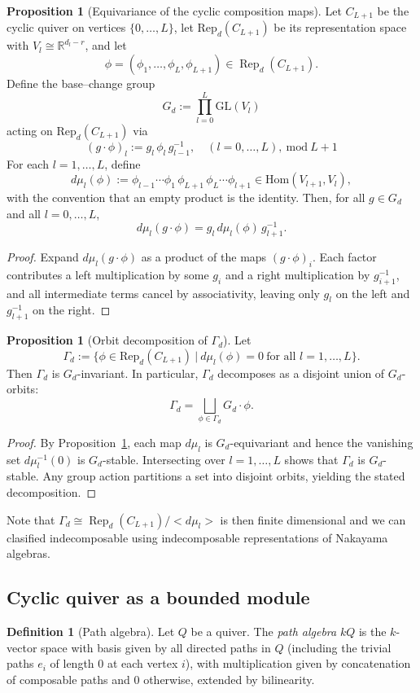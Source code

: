 \documentclass{article}
\newcommand{\Rep}{\operatorname{Rep}}
\theoremstyle{definition}
\newtheorem{proposition}[theorem]{Proposition}
\newtheorem{definition}[theorem]{Definition}
\begin{document}
\begin{proposition}[Equivariance of the cyclic composition maps]\label{prop:mu-equivariant}
Let $C_{L+1}$ be the cyclic quiver on vertices $\{0,\ldots,L\}$, let $\mathrm{Rep}_{d}(C_{L+1})$ be its representation space with
$V_l\cong\mathbb{R}^{d_l-r}$, and let
\[\phi=(\phi_1,\ldots,\phi_L,\phi_{L+1})\in \Rep_d(C_{L+1}).\]
Define the base--change group
\[
G_d:=\prod_{l=0}^{L} \mathrm{GL}(V_l)
\]
acting on $\mathrm{Rep}_{d}(C_{L+1})$ via
\[
(g\cdot \phi)_l := g_l\,\phi_l\,g_{l-1}^{-1},\quad (l=0,\ldots,L), \ \text{mod} \ L+1
\]
For each $l=1,\ldots,L$, define
\[
d\mu_l(\phi) := \phi_{l-1}\cdots\phi_1\,\phi_{L+1}\,\phi_L\cdots\phi_{l+1}\in\mathrm{Hom}(V_{l+1},V_l),
\]
with the convention that an empty product is the identity.
Then, for all $g\in G_d$ and all $l=0,\ldots,L$,
\[
d\mu_l(g\cdot \phi) = g_l\,d\mu_l(\phi)\,g_{l+1}^{-1}.
\]
\end{proposition}

\begin{proof}
Expand $d\mu_l(g\cdot\phi)$ as a product of the maps $(g\cdot\phi)_i$. Each factor contributes a left multiplication by some $g_i$ and a right multiplication by $g_{i+1}^{-1}$, and all intermediate terms cancel by associativity, leaving only $g_l$ on the left and $g_{l+1}^{-1}$ on the right.
\end{proof}

\begin{proposition}[Orbit decomposition of $\Gamma_d$]\label{prop:GammaC-orbits}
Let
\[
\Gamma_d:=\Big\{\phi\in \mathrm{Rep}_{d}(C_{L+1})\ \Big|\ d\mu_l(\phi)=0\ \text{for all }l=1,\ldots,L\Big\}.
\]
Then $\Gamma_d$ is $G_d$-invariant. In particular, $\Gamma_d$ decomposes as a disjoint union of $G_d$-orbits:
\[
\Gamma_d = \bigsqcup_{\phi\in \Gamma_d} G_d\cdot \phi.
\]
\end{proposition}

\begin{proof}
By Proposition~\ref{prop:mu-equivariant}, each map $d\mu_l$ is $G_d$-equivariant and hence the vanishing set $d\mu_l^{-1}(0)$ is $G_d$-stable. Intersecting over $l=1,\ldots,L$ shows that $\Gamma_d$ is $G_d$-stable. Any group action partitions a set into disjoint orbits, yielding the stated decomposition.
\end{proof}
Note that $\Gamma_d\cong \Rep_d(C_{L+1})/< d\mu_l > $ is then finite dimensional and we can clasified indecomposable using indecomposable representations of Nakayama algebras.
\subsection{Cyclic quiver as a bounded module}
\begin{definition}[Path algebra]
Let $Q$ be a quiver. The \emph{path algebra} $kQ$ is the $k$-vector space with basis given by all directed paths in $Q$ (including the trivial paths $e_i$ of length $0$ at each vertex $i$), with multiplication given by concatenation of composable paths and $0$ otherwise, extended by bilinearity.
\end{definition}
\end{document}
